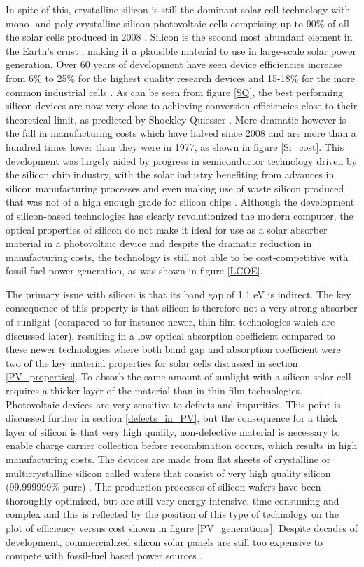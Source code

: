 In spite of this, crystalline silicon is still the dominant solar cell technology with mono- and poly-crystalline silicon photovoltaic cells comprising up to 90\% of all the solar cells produced in 2008  \cite{Si_rev}. Silicon is the second most abundant element in the Earth's crust \cite{Si_abundance}, making it a plausible material to use in large-scale solar power generation. Over 60 years of development have seen device efficiencies increase from 6\% to 25\% for the highest quality research devices and 15-18\% for the more common industrial cells \cite{Si_rev}. As can be seen from figure \ref{SQ}, the best performing silicon devices are now very close to achieving conversion efficiencies close to their theoretical limit, as predicted by Shockley-Quiesser \cite{SQ_1961}. More dramatic however is the fall in manufacturing costs which have halved since 2008 and are more than a hundred times lower than they were in 1977, as shown in figure \ref{Si_cost}. This development was largely aided by progress in semiconductor technology driven by the silicon chip industry, with the solar industry benefiting from advances in silicon manufacturing processes and even making use of waste silicon produced that was not of a high enough grade for silicon chips \cite{PV_history1}. Although the development of silicon-based technologies has clearly revolutionized the modern computer, the optical properties of silicon do not make it ideal for use as a solar absorber material in a photovoltaic device and despite the dramatic reduction in manufacturing costs, the technology is still not able to be cost-competitive with fossil-fuel power generation, as was shown in figure \ref{LCOE}.

The primary issue with silicon is that its band gap of 1.1 eV is indirect. The key consequence of this property is that silicon is therefore not a very strong absorber of sunlight (compared to for instance newer, thin-film technologies which are discussed later), resulting in a low optical absorption coefficient  compared to these newer technologies where both band gap and absorption coefficient were two of the key material properties for solar cells discussed in section \ref{PV_properties}. To absorb the same amount of sunlight with a silicon solar cell requires a thicker layer of the material than in thin-film technologies. Photovoltaic devices are very sensitive to defects and impurities. This point is discussed further in section \ref{defects_in_PV}, but the consequence for a thick layer of silicon is that very high quality, non-defective material is necessary to enable charge carrier collection before recombination occurs, which results in high manufacturing costs. The devices are made from flat sheets of crystalline or multicrystalline silicon called wafers that consist of very high quality silicon (99.999999\% pure) 
\cite{sus_book_5}.
The production processes of silicon wafers have been thoroughly optimised, but are still very energy-intensive, time-consuming and complex \cite{emerging_pv} and this is reflected by the position of this type of technology on the plot of efficiency versus cost shown in figure \ref{PV_generations}. Despite decades of development, commercialized silicon solar panels are still too expensive to compete with fossil-fuel based power sources \cite{FE_PV_rev1_5}. 

